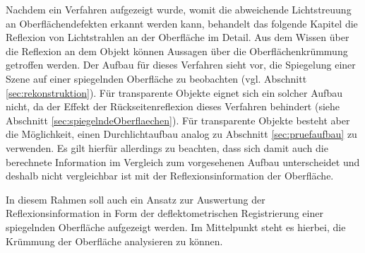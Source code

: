 Nachdem ein Verfahren aufgezeigt wurde, womit die abweichende Lichtstreuung an Oberflächendefekten erkannt werden kann, behandelt das folgende Kapitel die Reflexion von Lichtstrahlen an der Oberfläche im Detail.
Aus dem Wissen über die Reflexion an dem Objekt können Aussagen über die Oberflächenkrümmung getroffen werden.
Der Aufbau für dieses Verfahren sieht vor, die Spiegelung einer Szene auf einer spiegelnden Oberfläche zu beobachten (vgl. Abschnitt \ref{sec:rekonstruktion}).
Für transparente Objekte eignet sich ein solcher Aufbau nicht, da der Effekt der Rückseitenreflexion dieses Verfahren behindert (siehe Abschnitt \ref{sec:spiegelndeOberflaechen}).
Für transparente Objekte besteht aber die Möglichkeit, einen Durchlichtaufbau analog zu Abschnitt \ref{sec:pruefaufbau} zu verwenden.
Es gilt hierfür allerdings zu beachten, dass sich damit auch die berechnete Information im Vergleich zum vorgesehenen Aufbau unterscheidet und deshalb nicht vergleichbar ist mit der Reflexionsinformation der Oberfläche.

\p
In diesem Rahmen soll auch ein Ansatz zur Auswertung der Reflexionsinformation in Form der deflektometrischen Registrierung einer spiegelnden Oberfläche aufgezeigt werden.
Im Mittelpunkt steht es hierbei, die Krümmung der Oberfläche analysieren zu können.

